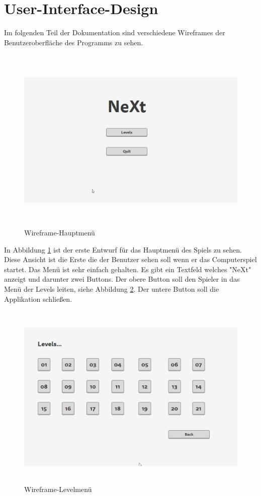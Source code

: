 \section{User-Interface-Design}
Im folgenden Teil der Dokumentation sind verschiedene Wireframes der Benutzeroberfläche des Programms zu sehen.
\begin{figure}[H]
	\centering
	\includegraphics[width=16cm, height=9cm]{images/WireframeMainmenu.png}
	\caption{Wireframe-Hauptmenü}
	\label{WireframeMainmenu}
\end{figure}
In Abbildung \ref{WireframeMainmenu} ist der erste Entwurf für das Hauptmenü des Spiels zu sehen. Diese Ansicht ist die Erste die der Benutzer sehen soll wenn er das Computerspiel startet. Das Menü ist sehr einfach gehalten. Es gibt ein Textfeld welches "NeXt" anzeigt und darunter zwei Buttons. Der obere Button soll  den Spieler in das Menü der Levels leiten, siehe Abbildung \ref{WireframeLevelsmenu}. Der untere Button soll  die Applikation schließen.
\begin{figure}[H]
	\centering
	\includegraphics[width=16cm, height=9cm]{images/WireframeLevelsmenu.png}
	\caption{Wireframe-Levelmenü}
	\label{WireframeLevelsmenu}
\end{figure}
